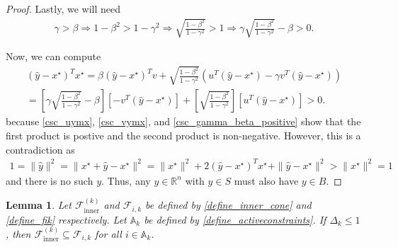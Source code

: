 \documentclass{article}
\newtheorem{lemma}[theorem]{Lemma}
\theoremstyle{case}
\numberwithin{theorem}{subsection}
\newcommand{\activeconstraintsk}{{\mathbb A_{k}}}
\newcommand{\dk}{\Delta_k}
\newcommand{\fcki}{{\mathcal {F}^{(k)}_{\textrm{inner}}}}
\newcommand{\fik}{{\mathcal F_{i, k}}}
\newcommand{\Rn}{\mathbb R^n}
\begin{document}
\begin{proof}
Lastly, we will need
\begin{align}
\gamma > \beta 
\Longrightarrow 1 - \beta^2 > 1 - \gamma^2
\Longrightarrow \sqrt{\frac{1 - \beta^2}{1 - \gamma^2}} > 1
\Longrightarrow \gamma \sqrt{\frac{1 - \beta^2}{1 - \gamma^2}} - \beta > 0. \label{csc_gamma_beta_positive}
\end{align}

Now, we can compute
\begin{align*}
{\left(\hat y - x^{\star}\right)}^Tx^{\star} = 
\beta {\left(\hat y - x^{\star}\right)}^Tv
+ \sqrt{\frac{1 - \beta^2}{1 - \gamma^2}} 
\left(u^T\left(\hat y - x^{\star}\right) - \gamma v^T \left(\hat y - x^{\star}\right) \right)\\ 
= \left[\gamma \sqrt{\frac{1 - \beta^2}{1 - \gamma^2}} - \beta\right] \left[-v^T\left(\hat y - x^{\star}\right)\right]
+ \left[\sqrt{\frac{1 - \beta^2}{1 - \gamma^2}}\right] \left[u^T\left(\hat y - x^{\star}\right) \right] > 0.
\end{align*}
because \cref{csc_uymx}, \cref{csc_vymx}, and \cref{csc_gamma_beta_positive} show that the first product is postive and the second product is non-negative.
However, this is a contradiction as
\begin{align*}
1 = \|\hat y\|^2 = \|x^{\star} + \hat y - x^{\star}\|^2 = \|x^{\star}\|^2 + 2{\left(\hat y - x^{\star}\right)}^Tx^{\star} + \|\hat y - x^{\star}\|^2 > \|x^{\star}\|^2 = 1
\end{align*}
and there is no such $y$.
Thus, any $y \in\Rn$ with $y \in S$ must also have $y \in B$.
\end{proof}


\begin{lemma}
\label{inner_cone_inside_each_cone}
Let $\fcki$ and $\fik$ be defined by \cref{define_inner_cone} and \cref{define_fik} respectively.
Let $\activeconstraintsk$ be defined by \cref{define_activeconstraints}.
If $\dk \le 1$, then $\fcki \subseteq \fik$ for all $i \in \activeconstraintsk$.
\end{lemma}
\end{document}
